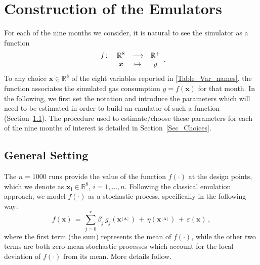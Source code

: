 \documentclass[a4paper, 12pt]{article}
\newcommand{\R}{\mathbb{R}}
\newcommand{\bd}[1]{\boldsymbol{#1}}
\newcommand{\x}{\bd x}
\newcommand{\A}{{_{[A]}}}
\newcommand{\eps}{\varepsilon}
\begin{document}



\section{Construction of the Emulators}\label{Sec_Emulators}

For each of the nine months we consider, it is natural to see the simulator as a function
\begin{equation*}
\begin{array}{l c c c}
 f \colon &  \R^8   & \longrightarrow & \R^+ \\
          &   \x  &     \mapsto     &  y
\end{array}.
\end{equation*}
To any choice $\x \in \R^8$ of the eight variables reported in \autoref{Table_Var_names}, the function associates the simulated gas consumption 
$y=f(\x)$ for that month.
In the following, we first set the notation and introduce the parameters which will need to be estimated in order to build an emulator of such a function (Section~\ref{Sec_General}). The procedure used to estimate/choose these parameters for each of the nine months of interest is detailed in Section~\ref{Sec_Choices}.

\subsection{General Setting}\label{Sec_General}
The $n=1000$ runs provide the value of the function $f(\cdot)$ at the design points, 
which we denote as $\bd{x_i} \in \R^8$, $i=1, \dots, n$.
Following the classical emulation approach, we model $f(\cdot)$ as a stochastic process, specifically in the following way:
\begin{equation}\label{f}
 f(\x) \,=\, \sum_{j=0}^r \beta_j \, g_j(\bd{x^\A}) \,+\, \eta(\bd{x^\A}) \,+\, \eps(\x) \,,
\end{equation}
where the first term (the sum) represents the mean of $f(\cdot)$, while the other two terms are both zero-mean stochastic processes which account for the local deviation of 
$f(\cdot)$ from its mean. More details follow.
\end{document}
